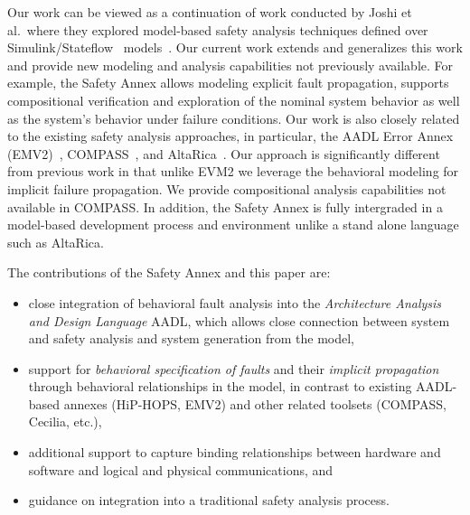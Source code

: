 Our work can be viewed as a continuation of work conducted by Joshi et al.~where they explored model-based safety analysis techniques defined over Simulink/Stateflow~\cite{MathWorks} models~\cite{Joshi05:SafeComp,Joshi07:Hase,Joshi05:Dasc,DBLP:conf/cav/BozzanoCPJKPRT15}. Our current work extends and generalizes this work and provide new modeling and analysis capabilities not previously available.  For example, the Safety Annex allows modeling explicit fault propagation, supports compositional verification and exploration of the nominal system behavior as well as the system's behavior under failure conditions. Our work is also closely related to the existing safety analysis approaches, in particular, the AADL Error Annex (EMV2)~\cite{EMV2}, COMPASS~\cite{10.1007/978-3-642-04468-7_15}, and AltaRica~\cite{PROSVIRNOVA2013127,BieberERTS2018}. Our approach is significantly different from previous work in that unlike EVM2 we leverage the behavioral modeling for implicit failure propagation.  We provide compositional analysis capabilities not available in COMPASS.  In addition, the Safety Annex  is fully intergraded in a model-based development process and environment unlike a stand alone language such as AltaRica. 

The contributions of the Safety Annex and this paper are:
\begin{itemize}
\renewcommand{\labelitemi}{\textbullet}
		\item close integration of behavioral fault analysis into the {\em Architecture Analysis and Design Language} AADL, which allows close connection between system and safety analysis and system generation from the model,
		\item support for {\em behavioral specification of faults} and their {\em implicit propagation} through behavioral relationships in the model, in contrast to existing AADL-based annexes (HiP-HOPS, EMV2) and other related toolsets (COMPASS, Cecilia, etc.),
		\item additional support to capture binding relationships between hardware and software and logical and physical communications, and
		\item guidance on integration into a traditional safety analysis process.
\end{itemize}


